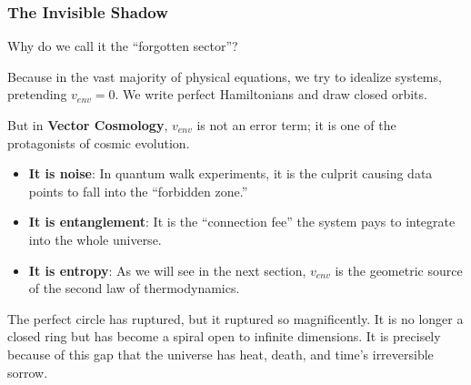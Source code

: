 \subsubsection{The Invisible Shadow}

Why do we call it the ``forgotten sector''?

Because in the vast majority of physical equations, we try to idealize systems, pretending $v_{env} = 0$. We write perfect Hamiltonians and draw closed orbits.

But in \textbf{Vector Cosmology}, $v_{env}$ is not an error term; it is one of the protagonists of cosmic evolution.

\begin{itemize}
\item \textbf{It is noise}: In quantum walk experiments, it is the culprit causing data points to fall into the ``forbidden zone.''

\item \textbf{It is entanglement}: It is the ``connection fee'' the system pays to integrate into the whole universe.

\item \textbf{It is entropy}: As we will see in the next section, $v_{env}$ is the geometric source of the second law of thermodynamics.
\end{itemize}

The perfect circle has ruptured, but it ruptured so magnificently. It is no longer a closed ring but has become a spiral open to infinite dimensions. It is precisely because of this gap that the universe has heat, death, and time's irreversible sorrow.

